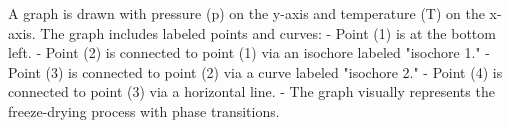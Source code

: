 A graph is drawn with pressure (p) on the y-axis and temperature (T) on the x-axis. The graph includes labeled points and curves:  
- Point (1) is at the bottom left.  
- Point (2) is connected to point (1) via an isochore labeled "isochore 1."  
- Point (3) is connected to point (2) via a curve labeled "isochore 2."  
- Point (4) is connected to point (3) via a horizontal line.  
- The graph visually represents the freeze-drying process with phase transitions.